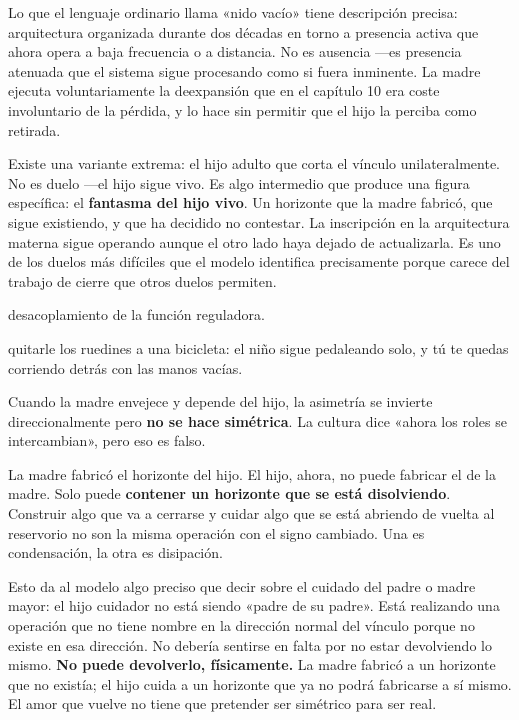 Lo que el lenguaje ordinario llama «nido vacío» tiene descripción precisa: arquitectura organizada durante dos décadas en torno a presencia activa que ahora opera a baja frecuencia o a distancia. No es ausencia —es presencia atenuada que el sistema sigue procesando como si fuera inminente. La madre ejecuta voluntariamente la deexpansión que en el capítulo 10 era coste involuntario de la pérdida, y lo hace sin permitir que el hijo la perciba como retirada.

Existe una variante extrema: el hijo adulto que corta el vínculo unilateralmente. No es duelo —el hijo sigue vivo. Es algo intermedio que produce una figura específica: el \textbf{fantasma del hijo vivo}. Un horizonte que la madre fabricó, que sigue existiendo, y que ha decidido no contestar. La inscripción en la arquitectura materna sigue operando aunque el otro lado haya dejado de actualizarla. Es uno de los duelos más difíciles que el modelo identifica precisamente porque carece del trabajo de cierre que otros duelos permiten.

\begin{fisica}
 desacoplamiento de la función reguladora.

 quitarle los ruedines a una bicicleta: el niño sigue pedaleando solo, y tú te quedas corriendo detrás con las manos vacías.
\end{fisica}
\noindent Cuando la madre envejece y depende del hijo, la asimetría se invierte direccionalmente pero \textbf{no se hace simétrica}. La cultura dice «ahora los roles se intercambian», pero eso es falso.

La madre fabricó el horizonte del hijo. El hijo, ahora, no puede fabricar el de la madre. Solo puede \textbf{contener un horizonte que se está disolviendo}. Construir algo que va a cerrarse y cuidar algo que se está abriendo de vuelta al reservorio no son la misma operación con el signo cambiado. Una es condensación, la otra es disipación.

Esto da al modelo algo preciso que decir sobre el cuidado del padre o madre mayor: el hijo cuidador no está siendo «padre de su padre». Está realizando una operación que no tiene nombre en la dirección normal del vínculo porque no existe en esa dirección. No debería sentirse en falta por no estar devolviendo lo mismo. \textbf{No puede devolverlo, físicamente.} La madre fabricó a un horizonte que no existía; el hijo cuida a un horizonte que ya no podrá fabricarse a sí mismo. El amor que vuelve no tiene que pretender ser simétrico para ser real.


